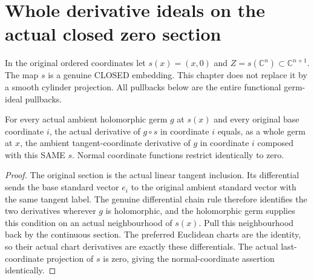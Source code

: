 \section{Whole derivative ideals on the actual closed zero section}

In the original ordered coordinates let $s(x)=(x,0)$ and $Z=s(\mathbb C^n)\subset\mathbb C^{n+1}$. The map $s$ is a genuine CLOSED embedding. This chapter does not replace it by a smooth cylinder projection. All pullbacks below are the entire functional germ-ideal pullbacks.

\begin{lemma}
\label{hir:actual-zero-section-tangent-derivatives}
\leanok
For every actual ambient holomorphic germ $g$ at $s(x)$ and every original base coordinate $i$, the actual derivative of $g\circ s$ in coordinate $i$ equals, as a whole germ at $x$, the ambient tangent-coordinate derivative of $g$ in coordinate $i$ composed with this SAME $s$. Normal coordinate functions restrict identically to zero.
\end{lemma}
\begin{proof}
The original section is the actual linear tangent inclusion. Its differential sends the base standard vector $e_i$ to the original ambient standard vector with the same tangent label. The genuine differential chain rule therefore identifies the two derivatives wherever $g$ is holomorphic, and the holomorphic germ supplies this condition on an actual neighbourhood of $s(x)$. Pull this neighbourhood back by the continuous section. The preferred Euclidean charts are the identity, so their actual chart derivatives are exactly these differentials. The actual last-coordinate projection of $s$ is zero, giving the normal-coordinate assertion identically.
\end{proof}


